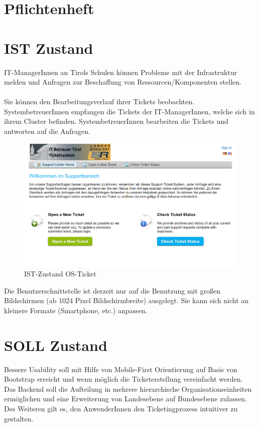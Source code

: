 \newpage
\section{Pflichtenheft}
\section{IST Zustand}
IT-ManagerInnen an Tirols Schulen können Probleme mit der Infrastruktur melden und Anfragen zur Beschaffung von Ressourcen/Komponenten stellen.
\paragraph{}
Sie können den Bearbeitungsverlauf ihrer Tickets beobachten. SystembetreuerInnen empfangen die Tickets der IT-ManagerInnen, welche sich in ihrem Cluster befinden. SystembetreuerInnen bearbeiten die Tickets und antworten auf die Anfragen.

\begin{figure}[h]
	\centering
	\includegraphics[scale=0.725]{figures/Ist_Login.png}
	\caption{IST-Zustand OS-Ticket}
	\label{Abb_IST-Zustand}
\end{figure}
\noindent Die Benutzerschnittstelle ist derzeit nur auf die Benutzung mit großen Bildschirmen (ab 1024 Pixel Bildschirmbreite) ausgelegt. Sie kann sich nicht an kleinere Formate (Smartphone, etc.) anpassen.

\section{SOLL Zustand}
Bessere Usability soll mit Hilfe von Mobile-First Orientierung auf Basis von Bootstrap erreicht und wenn möglich die Ticketerstellung vereinfacht werden.
\\
Das Backend soll die Aufteilung in mehrere hierarchische Organisationseinheiten ermöglichen und eine Erweiterung von Landesebene auf Bundesebene zulassen. Des Weiteren gilt es, den AnwenderInnen den Ticketingprozess intuitiver zu gestalten.

